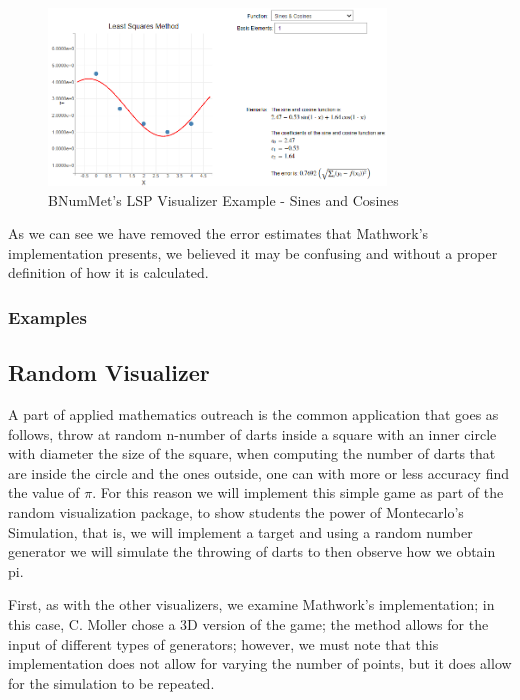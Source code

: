 \begin{figure}[H]
    \centering
    \includegraphics[width=0.8\textwidth]{Include/Images/Thesis/Development/Visualizers/LSP/BNumMet.LSP.Ex1.3.png}
    \caption{BNumMet's LSP Visualizer Example - Sines and Cosines}
    \label{fig:BNumMet's Least Squares Visualizer Example- Sines and Cosines}
\end{figure}
As we can see we have removed the error estimates that Mathwork's implementation presents, we believed it may be confusing and without a proper definition of how it is calculated.
\subsubsection{Examples}
	

\subsection{Random Visualizer}
A part of applied mathematics outreach is the common application that goes as follows, throw at random n-number of darts inside a square with an inner circle with diameter the size of the square, when computing the number of darts that are inside the circle and the ones outside, one can with more or less accuracy find the value of $\pi$. For this reason we will implement this simple game as part of the random visualization package, to show students the power of Montecarlo's Simulation, that is, we will implement a target and using a random number generator we will simulate the throwing of darts to then observe how we obtain pi.

First, as with the other visualizers, we examine Mathwork's implementation; in this case, C. Moller chose a 3D version of the game; the method allows for the input of different types of generators; however, we must note that this implementation does not allow for varying the number of points, but it does allow for the simulation to be repeated.

